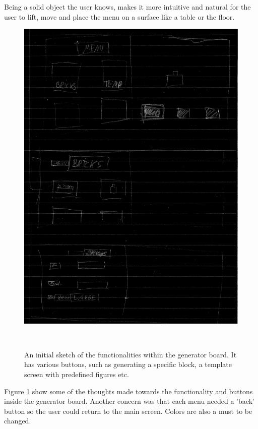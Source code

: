  Being a solid object the user knows, makes it more intuitive and natural for the user to lift, move and place the menu on a surface like a table or the floor.
 \begin{figure}[h]
 	\centering
 	\includegraphics[width=0.7\columnwidth]{figures/Generator/gen4_22.png}
 	\caption{An initial sketch of the functionalities within the generator board. It has various buttons, such as generating a specific block, a template screen with predefined figures etc.}~\label{fig:genfuncs}
 \end{figure}
 Figure \ref{fig:genfuncs} show some of the thoughts made towards the functionality and buttons inside the generator board. Another concern was that each menu needed a 'back' button so the user could return to the main screen. Colors are also a must to be changed. 
